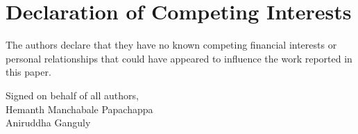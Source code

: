 \documentclass[11pt]{article}
\begin{document}
\section*{Declaration of Competing Interests}

The authors declare that they have no known competing financial interests or personal relationships that could have appeared to influence the work reported in this paper.

\vspace{2em}

Signed on behalf of all authors,\\

Hemanth Manchabale Papachappa\\
Aniruddha Ganguly
\end{document}
